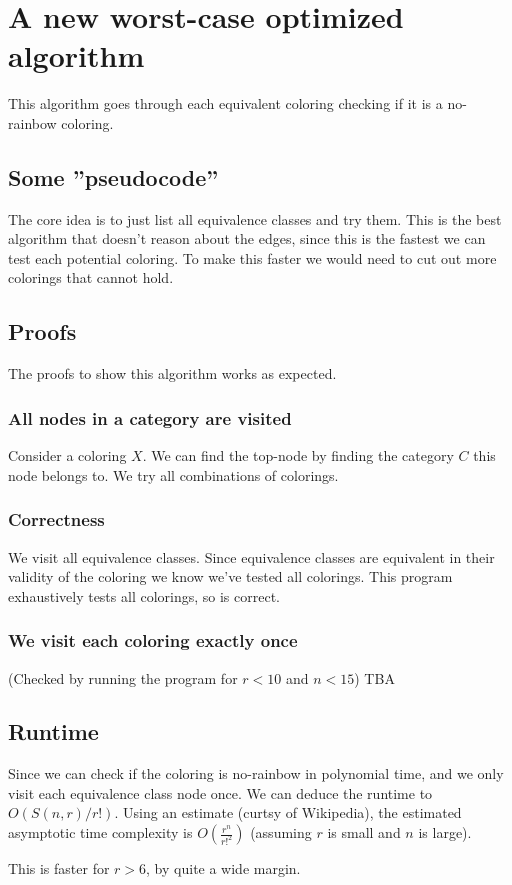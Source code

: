 \documentclass{article}
\begin{document}

\section{A new worst-case optimized algorithm}
This algorithm goes through each equivalent coloring checking if it is a no-rainbow coloring.

\pagebreak
\subsection{Some ''pseudocode''}
The core idea is to just list all equivalence classes and try them. This is the best algorithm that doesn't reason about the edges, since this is the fastest we can test each potential coloring. To make this faster we would need to cut out more colorings that cannot hold.

\begin{adjustbox}{max size={\textwidth}{\textheight}}

\end{adjustbox}

\subsection{Proofs}
The proofs to show this algorithm works as expected.

\subsubsection{All nodes in a category are visited}
Consider a coloring $X$. We can find the top-node by finding the category $C$ this node belongs to.
We try all combinations of colorings.

\subsubsection{Correctness}
We visit all equivalence classes. Since equivalence classes are equivalent in their validity of the coloring we know we've tested all colorings. This program exhaustively tests all colorings, so is correct.

\subsubsection{We visit each coloring exactly once}
(Checked by running the program for $r<10$ and $n < 15$)
TBA

\subsection{Runtime}
Since we can check if the coloring is no-rainbow in polynomial time, and we only visit each equivalence class node once. We can deduce the runtime to $O(S(n, r)/r!)$. Using an estimate (curtsy of Wikipedia), the estimated asymptotic time complexity is $O(\frac{r^n}{r!^2})$ (assuming $r$ is small and $n$ is large).

This is faster for $r > 6$, by quite a wide margin.
\end{document}
